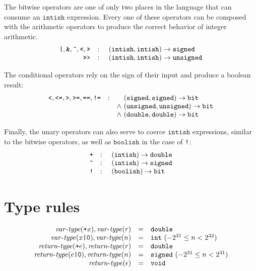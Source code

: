 \documentclass{article}
\newcommand{\vartype}{\mathit{var}\mbox{-}\mathit{type}}
\newcommand{\rettype}{\mathit{return}\mbox{-}\mathit{type}}
\newcommand{\funty}[2]{({#1}) \rightarrow {#2}}
\newcommand{\mathjs}[1]{\mbox{\texttt{{#1}}}}
\newcommand{\bit}{\mathtt{bit}}
\newcommand{\unsigned}{\mathtt{unsigned}}
\newcommand{\signed}{\mathtt{signed}}
\newcommand{\double}{\mathtt{double}}
\newcommand{\void}{\mathtt{void}}
\newcommand{\todouble}[1]{\mathjs{+}{#1}}
\renewcommand{\int}{\mathtt{int}}
\newcommand{\boolish}{\mathtt{boolish}}
\newcommand{\intish}{\mathtt{intish}}
\begin{document}
The bitwise operators are one of only two places in the language that
can consume an $\intish$ expression. Every one of these operators can
be composed with the arithmetic operators to produce the correct
behavior of integer arithmetic.
\[
\begin{array}{rcc@{\ }l}
\mathjs{|}, \mathjs{\&}, \mathjs{\^{}}, \mathjs{<<}, \mathjs{>>}
                 & : &       & \funty{\intish, \intish}{\signed} \\
\mathjs{>>>}     & : &       & \funty{\intish, \intish}{\unsigned} \\
\end{array}
\]

The conditional operators rely on the sign of their input and produce
a boolean result:
\[
\begin{array}{rcc@{\ }l}
\mathjs{<}, \mathjs{<=}, \mathjs{>}, \mathjs{>=}, \mathjs{==}, \mathjs{!=}
                 & : &       & \funty{\signed, \signed}{\bit} \\
                 &   & \land & \funty{\unsigned, \unsigned}{\bit} \\
                 &   & \land & \funty{\double, \double}{\bit} \\
\end{array}
\]

Finally, the unary operators can also serve to coerce $\intish$
expressions, similar to the bitwise operators, as well as $\boolish$
in the case of $\mathjs{!}$:
\[
\begin{array}{rcc@{\ }l}
\mathjs{+}       & : &       & \funty{\intish}{\double} \\
\mathjs{\~{}}    & : &       & \funty{\intish}{\signed} \\
\mathjs{!}       & : &       & \funty{\boolish}{\bit} \\
\end{array}
\]

\section{Type rules}

\[
\begin{array}{rcl}
\vartype(\todouble{x}), \vartype(r) & = & \double \\
\vartype(x\mathjs{|0}), \vartype(n) & = & \int \mbox{ $(-2^{31} \leq n < 2^{32})$} \\
\rettype(\todouble{e}), \rettype(r) & = & \double \\
\rettype(e\mathjs{|0}), \rettype(n) & = & \signed \mbox{ $(-2^{31} \leq n < 2^{31})$} \\
\rettype(\epsilon)                  & = & \void \\
\end{array}
\]
\end{document}
